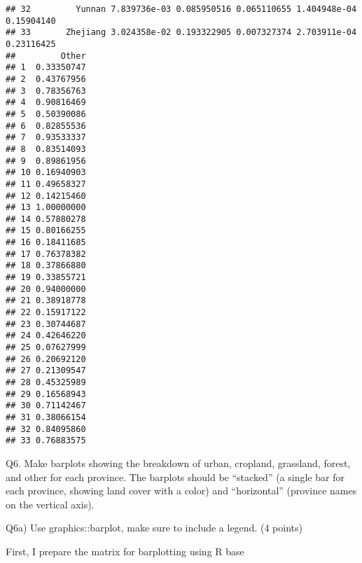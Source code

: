 \documentclass[
]{article}
\newenvironment{Shaded}{\begin{snugshade}}{\end{snugshade}}
\newcommand{\AttributeTok}[1]{\textcolor[rgb]{0.77,0.63,0.00}{#1}}
\newcommand{\CommentTok}[1]{\textcolor[rgb]{0.56,0.35,0.01}{\textit{#1}}}
\newcommand{\FunctionTok}[1]{\textcolor[rgb]{0.00,0.00,0.00}{#1}}
\newcommand{\NormalTok}[1]{#1}
\newcommand{\OtherTok}[1]{\textcolor[rgb]{0.56,0.35,0.01}{#1}}
\newcommand{\SpecialCharTok}[1]{\textcolor[rgb]{0.00,0.00,0.00}{#1}}
\newcommand{\StringTok}[1]{\textcolor[rgb]{0.31,0.60,0.02}{#1}}
\begin{document}
\begin{verbatim}
## 32         Yunnan 7.839736e-03 0.085950516 0.065110655 1.404948e-04 0.15904140
## 33       Zhejiang 3.024358e-02 0.193322905 0.007327374 2.703911e-04 0.23116425
##         Other
## 1  0.33350747
## 2  0.43767956
## 3  0.78356763
## 4  0.90816469
## 5  0.50390086
## 6  0.82855536
## 7  0.93533337
## 8  0.83514093
## 9  0.89861956
## 10 0.16940903
## 11 0.49658327
## 12 0.14215460
## 13 1.00000000
## 14 0.57880278
## 15 0.80166255
## 16 0.18411685
## 17 0.76378382
## 18 0.37866880
## 19 0.33855721
## 20 0.94000000
## 21 0.38918778
## 22 0.15917122
## 23 0.30744687
## 24 0.42646220
## 25 0.07627999
## 26 0.20692120
## 27 0.21309547
## 28 0.45325989
## 29 0.16568943
## 30 0.71142467
## 31 0.38066154
## 32 0.84095860
## 33 0.76883575
\end{verbatim}

Q6. Make barplots showing the breakdown of urban, cropland, grassland,
forest, and other for each province. The barplots should be ``stacked''
(a single bar for each province, showing land cover with a color) and
``horizontal'' (province names on the vertical axis).

Q6a) Use graphics::barplot, make sure to include a legend. (4 points)

First, I prepare the matrix for barplotting using R base

\begin{Shaded}
\end{Shaded}
\end{document}
